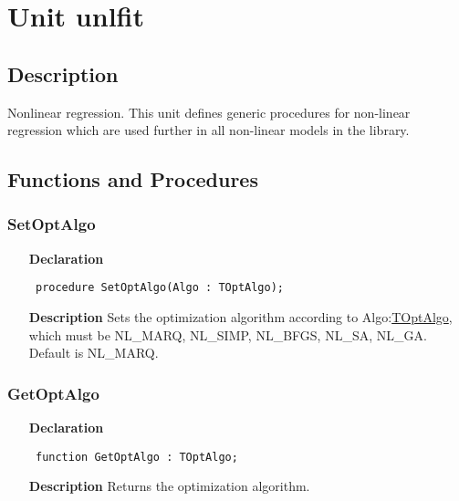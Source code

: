 \documentclass[12pt,a4paper,oneside]{report}
\newcommand{\declarationitem}[1]{\textbf{#1}}
\newcommand{\descriptiontitle}[1]{\textbf{#1}}
\newcommand{\code}[1]{\texttt{#1}}
\begin{document}
\section{Unit unlfit}
\label{unlfit}
\subsection{Description}
Nonlinear regression. This unit defines generic procedures for non-linear regression which are used further in all non-linear models in the library. 
\subsection{Functions and Procedures}
\subsubsection{SetOptAlgo}
\label{unlfit-SetOptAlgo}
\begin{itemize}\item[\declarationitem{Declaration}\hfill]
	\begin{flushleft}
		\code{
			procedure SetOptAlgo(Algo : TOptAlgo);}
		
	\end{flushleft}
	
	\par
	\item[\descriptiontitle{Description}]
	Sets the optimization algorithm according to Algo:\hyperref[utypes-TOptAlgo]{TOptAlgo}, which must be NL{\_}MARQ, NL{\_}SIMP, NL{\_}BFGS, NL{\_}SA, NL{\_}GA. Default is NL{\_}MARQ.
	
\end{itemize}
\subsubsection{GetOptAlgo}
\label{unlfit-GetOptAlgo}
\begin{itemize}\item[\declarationitem{Declaration}\hfill]
	\begin{flushleft}
		\code{
			function GetOptAlgo : TOptAlgo;}
		
	\end{flushleft}
	
	\par
	\item[\descriptiontitle{Description}]
	Returns the optimization algorithm.
	
\end{itemize}
\end{document}
